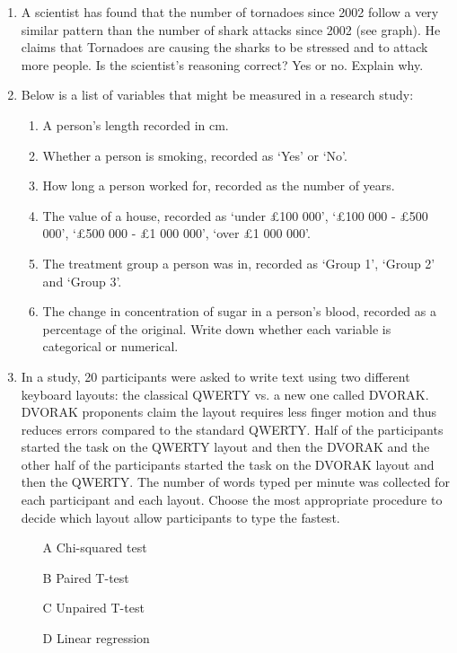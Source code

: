 \documentclass{article}
\newif\ifanswer
\begin{document}
\begin{enumerate}
\ifanswer  
(Answer: False. Kolmogorov-Smirnov test is more appropriate for large sample size $N >50$ and Shapiro-Wilk for small sample size $N <=50$)
\fi

\item A scientist has found that the number of tornadoes since 2002
  follow a very similar pattern than the number of shark attacks since
  2002 (see graph). He claims that Tornadoes are causing the sharks to
  be stressed and to attack more people. Is the scientist's reasoning
  correct? Yes or no. Explain why.


  \ifanswer

  (Answer: No. The graphs show a correlation between the two data sets but not causality.  A correlation does not mean that the change in one variable is the cause of the change in the values of the other variable.
  \fi

\item Below is a list of variables that might be measured in a research study:
\begin{enumerate}
\item A person's length recorded in cm.
\item Whether a person is smoking, recorded as \lq{}Yes\rq{} or \lq{}No\rq{}.
\item How long a person worked for, recorded as the number of years.
\item The value of a house, recorded as \lq{}under \pounds 100 000\rq{}, \lq{}\pounds 100 000 - \pounds 500 000\rq{}, \lq{}\pounds 500 000 - \pounds 1 000 000\rq{}, \lq{}over \pounds 1 000 000\rq{}.
\item The treatment group a person was in, recorded as \lq{}Group 1\rq{}, \lq{}Group 2\rq{} and \lq{}Group 3\rq{}.
\item The change in concentration of sugar in a person's blood, recorded as a percentage of the original.
Write down whether each variable is categorical or numerical.
\end{enumerate}

\ifanswer
 (Answer: b, d, e are categorical; a, c, f are numerical.)
\fi

\item In a study, 20 participants were asked to write text using two
  different keyboard layouts: the classical QWERTY vs. a new one
  called DVORAK. DVORAK proponents claim the layout requires less
  finger motion and thus reduces errors compared to the standard
  QWERTY. Half of the participants started the task on the QWERTY
  layout and then the DVORAK and the other half of the participants
  started the task on the DVORAK layout and then the QWERTY. The
  number of words typed per minute was collected for each participant
  and each layout. Choose the most appropriate procedure to decide
  which layout allow participants to type the fastest.
  \begin{itemize}
    \item[A] Chi-squared test 
\item[B] Paired T-test
\item[C] Unpaired T-test
\item[D] Linear regression
  \end{itemize}
  

\end{enumerate}
\end{document}
